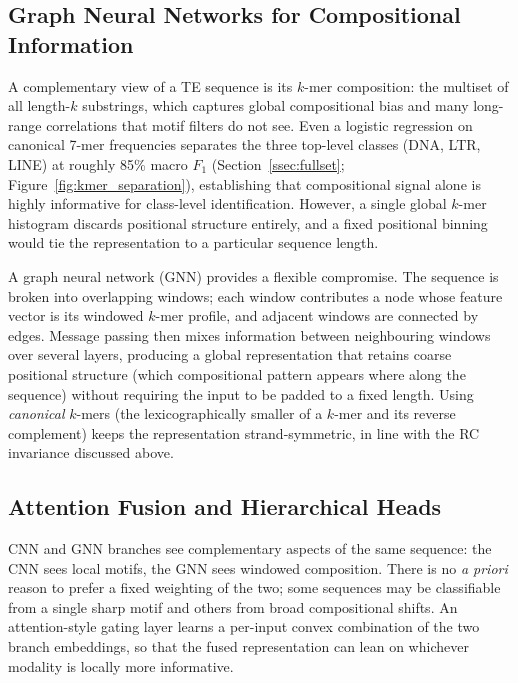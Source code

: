 \documentclass[12pt]{article}
\begin{document}
\subsection{Graph Neural Networks for Compositional Information}\label{ssec:gnn_intro}

A complementary view of a TE sequence is its $k$-mer composition: the multiset of all length-$k$ substrings, which captures global compositional bias and many long-range correlations that motif filters do not see. Even a logistic regression on canonical 7-mer frequencies separates the three top-level classes (DNA, LTR, LINE) at roughly 85\% macro $F_1$ (Section~\ref{ssec:fullset}; Figure~\ref{fig:kmer_separation}), establishing that compositional signal alone is highly informative for class-level identification. However, a single global $k$-mer histogram discards positional structure entirely, and a fixed positional binning would tie the representation to a particular sequence length.

A graph neural network (GNN) \cite{kipf2016semi,hamilton2017inductive,zhou2019graph} provides a flexible compromise. The sequence is broken into overlapping windows; each window contributes a node whose feature vector is its windowed $k$-mer profile, and adjacent windows are connected by edges. Message passing then mixes information between neighbouring windows over several layers, producing a global representation that retains coarse positional structure (which compositional pattern appears where along the sequence) without requiring the input to be padded to a fixed length. Using \emph{canonical} $k$-mers (the lexicographically smaller of a $k$-mer and its reverse complement) keeps the representation strand-symmetric, in line with the RC invariance discussed above.

\subsection{Attention Fusion and Hierarchical Heads}

CNN and GNN branches see complementary aspects of the same sequence: the CNN sees local motifs, the GNN sees windowed composition. There is no \emph{a priori} reason to prefer a fixed weighting of the two; some sequences may be classifiable from a single sharp motif and others from broad compositional shifts. An attention-style gating layer \cite{vaswani2017attention} learns a per-input convex combination of the two branch embeddings, so that the fused representation can lean on whichever modality is locally more informative.
\end{document}
